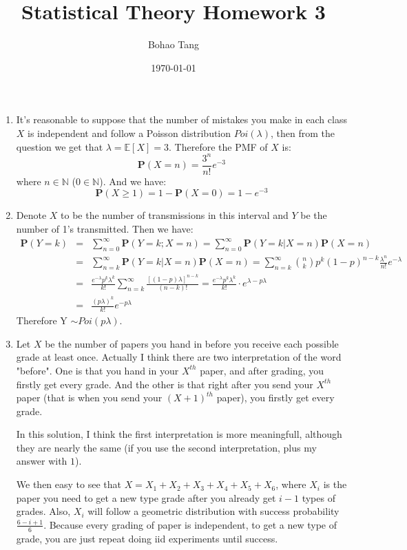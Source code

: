 \documentclass[12pt]{article}
\title{Statistical Theory Homework 3}
\date{\today}
\author{Bohao Tang}
\newcommand{\prob}[1]{\textbf{P}(#1)}
\begin{document}

\maketitle

\begin{enumerate}
    \item
    It's reasonable to suppose that the number of mistakes you make in each class $X$ is independent and follow a Poisson distribution
    $Poi(\lambda)$, then from the question we get that $\lambda = \mathbb{E}[X] = 3$. Therefore the PMF of $X$ is:
    $$\textbf{P}(X = n) = \frac{3^n}{n !} e^{-3}$$
    where $n \in \mathbb{N}$ ($0 \in \mathbb{N}$). And we have:
    $$\textbf{P}(X \ge 1) = 1 - \textbf{P}(X = 0) = 1 - e^{-3}$$
    \item
    Denote $X$ to be the number of transmissions in this interval and $Y$ be the number of 1's transmitted.
    Then we have:
    \begin{eqnarray}
        \prob{Y = k} &=& \sum_{n=0}^{\infty} \prob{Y = k; X = n} = \sum_{n=0}^{\infty} \prob{Y = k | X = n} \prob{X = n} \\
                     &=& \sum_{n=k}^{\infty} \prob{Y = k | X = n} \prob{X = n} = \sum_{n=k}^{\infty} \binom{n}{k} p^k (1-p)^{n-k} \frac{\lambda^n}{n !} e^{-\lambda} \\
                     &=& \frac{e^{-\lambda} p^k \lambda^k}{k !} \sum_{n=k}^{\infty}\frac{[(1-p)\lambda]^{n-k}}{(n-k)!} = \frac{e^{-\lambda} p^k \lambda^k}{k !} \cdot e^{\lambda - p\lambda} \\
                     &=& \frac{(p\lambda)^k}{k !} e^{-p\lambda}
    \end{eqnarray}
    Therefore Y $\sim Poi(p\lambda)$.
    \item
    Let $X$ be the number of papers you hand in before you receive each possible grade at least once. 
    Actually I think there are two interpretation of the word "before". One is that you hand in your $X^{th}$ paper, and after grading, you firstly get every grade.
    And the other is that right after you send your $X^{th}$ paper (that is when you send your $(X+1)^{th}$ paper), you firstly get every grade.
    
    In this solution, I think the first interpretation is more meaningfull, although they are nearly the same (if you use the second interpretation, plus my answer with $1$).

    We then easy to see that $X = X_1 + X_2 + X_3 + X_4 + X_5 + X_6$, where $X_i$ is the paper you need to get a new type grade after you already get $i - 1$ types of grades.
    Also, $X_i$ will follow a geometric distribution with success probability $\frac{6-i+1}{6}$. Because every grading of paper is independent, to get a new type of grade, you are just repeat doing iid experiments until success.
    

\end{enumerate}
\end{document}
